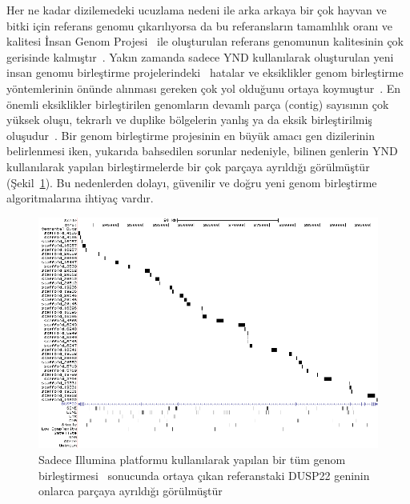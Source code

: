 \documentclass[11pt]{article}
\begin{document}
Her ne kadar dizilemedeki ucuzlama nedeni ile arka arkaya bir çok hayvan ve bitki için referans genomu çıkarılıyorsa da bu referansların tamamlılık oranı ve kalitesi İnsan Genom Projesi~\cite{IHGSC2001} ile oluşturulan referans genomunun kalitesinin çok gerisinde kalmıştır~\cite{Schatz2010,Alkan2011c}. Yakın zamanda sadece YND kullanılarak oluşturulan yeni insan genomu birleştirme projelerindeki~\cite{Li2010b,Gnerre2011} hatalar ve eksiklikler genom birleştirme yöntemlerinin önünde alınması gereken çok yol olduğunu ortaya koymuştur~\cite{Alkan2011c}. En önemli eksiklikler birleştirilen genomların devamlı parça (contig) sayısının çok yüksek oluşu, tekrarlı ve duplike bölgelerin yanlış ya da eksik birleştirilmiş oluşudur~\cite{Alkan2011c}. Bir genom birleştirme projesinin en büyük amacı gen dizilerinin belirlenmesi iken, yukarıda bahsedilen sorunlar nedeniyle, bilinen genlerin YND kullanılarak yapılan birleştirmelerde bir çok parçaya ayrıldığı görülmüştür (Şekil~\ref{fig:shatter}). Bu nedenlerden dolayı, güvenilir ve doğru yeni genom birleştirme algoritmalarına ihtiyaç vardır.


\begin{figure}[htb]
\begin{center}
  \includegraphics[scale=0.45]{shatter.png}
\end{center}
\caption{Sadece Illumina platformu kullanılarak yapılan bir tüm genom birleştirmesi~\cite{Li2010b} sonucunda ortaya çıkan referanstaki DUSP22 geninin onlarca parçaya ayrıldığı görülmüştür~\cite{Alkan2011c}}
\label{fig:shatter}
\end{figure}
\end{document}
